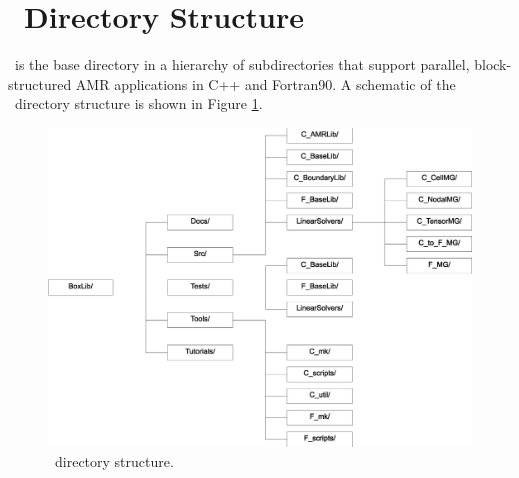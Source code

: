 \section{\BoxLib\ Directory Structure}

\BoxLib\ is the base directory in a hierarchy of subdirectories that
support parallel, block-structured AMR applications in C++ and Fortran90.
A schematic of the \BoxLib\ directory structure is shown in Figure 
\ref{fig:boxlib_directory}.
\begin{figure}[tb]
\centering
\includegraphics[width=6.5in]{./Introduction/boxlib_directory_bw2}
\caption{\label{fig:boxlib_directory}\BoxLib\ directory structure.}
\end{figure}

